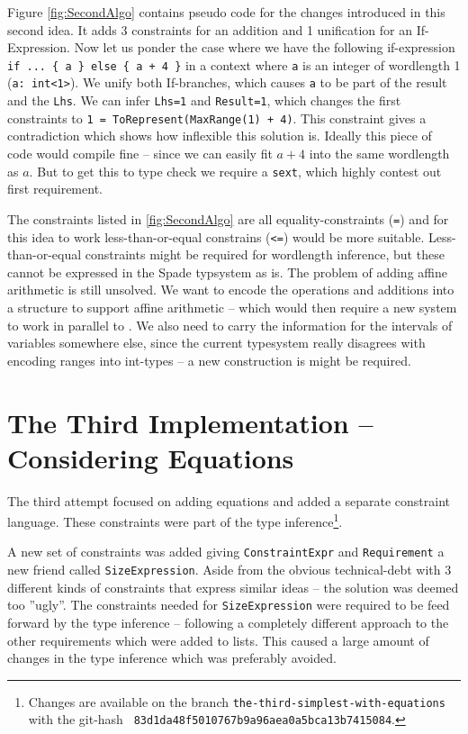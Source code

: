 Figure \ref{fig:SecondAlgo} contains pseudo code for the changes introduced in this second idea. It adds 3 constraints for an addition and 1 unification for an If-Expression. Now let us ponder the case where we have the following if-expression \verb!if ... { a } else { a + 4 }! in a context where \verb+a+ is an integer of wordlength 1 (\verb+a: int<1>+). We unify both If-branches, which causes \verb+a+ to be part of the result and the \verb+Lhs+. We can infer \verb+Lhs=1+ and \verb+Result=1+, which changes the first constraints to \verb!1 = ToRepresent(MaxRange(1) + 4)!. This constraint gives a contradiction which shows how inflexible this solution is. Ideally this piece of code would compile fine -- since we can easily fit $a + 4$ into the same wordlength as $a$. But to get this to type check we require a \verb+sext+, which highly contest out first requirement.

The constraints listed in \ref{fig:SecondAlgo} are all equality-constraints (\verb+=+) and for this idea to work less-than-or-equal constrains (\verb+<=+) would be more suitable. Less-than-or-equal constraints might be required for wordlength inference, but these cannot be expressed in the Spade typsystem as is. The problem of adding affine arithmetic is still unsolved. We want to encode the operations and additions into a structure to support affine arithmetic -- which would then require a new system to work in parallel to . We also need to carry the information for the intervals of variables somewhere else, since the current typesystem really disagrees with encoding ranges into int-types -- a new construction is might be required. 

\section{The Third Implementation -- Considering Equations}
\label{sec:Third}
The third attempt focused on adding equations and added a separate constraint language. These constraints were part of the type inference\cprotect\footnote{Changes are available on the branch \verb+the-third-simplest-with-equations+ with the git-hash \verb+ 83d1da48f5010767b9a96aea0a5bca13b7415084+.}.

A new set of constraints was added giving \verb+ConstraintExpr+ and \verb+Requirement+ a new friend called \verb+SizeExpression+. Aside from the obvious technical-debt with 3 different kinds of constraints that express similar ideas -- the solution was deemed too ''ugly''. The constraints needed for \verb+SizeExpression+ were required to be feed forward by the type inference -- following a completely different approach to the other requirements which were added to lists. This caused a large amount of changes in the type inference which was preferably avoided.

